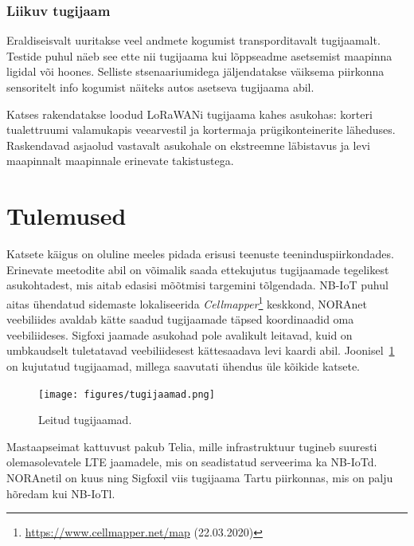 \documentclass[12pt]{article}
\begin{document}
    \subsubsection{Liikuv tugijaam}

    Eraldiseisvalt uuritakse veel andmete kogumist transporditavalt tugijaamalt.
    Testide puhul näeb see ette nii tugijaama kui lõppseadme asetsemist maapinna ligidal või hoones.
    Selliste stsenaariumidega jäljendatakse väiksema piirkonna sensoritelt info kogumist näiteks autos asetseva tugijaama abil.

    Katses rakendatakse loodud LoRaWANi tugijaama kahes asukohas: korteri tualettruumi valamukapis veearvestil ja kortermaja prügikonteinerite läheduses.
    Raskendavad asjaolud vastavalt asukohale on ekstreemne läbistavus ja levi maapinnalt maapinnale erinevate takistustega.

    \newpage


    \section{Tulemused}

    Katsete käigus on oluline meeles pidada erisusi teenuste teeninduspiirkondades.
    Erinevate meetodite abil on võimalik saada ettekujutus tugijaamade tegelikest asukohtadest, mis aitab edasisi mõõtmisi targemini tõlgendada.
    NB-IoT puhul aitas ühendatud sidemaste lokaliseerida \textit{Cellmapper}\footnote{\url{https://www.cellmapper.net/map} (22.03.2020)} keskkond, NORAnet veebiliides avaldab kätte saadud tugijaamade täpsed koordinaadid oma veebiliideses.
    Sigfoxi jaamade asukohad pole avalikult leitavad, kuid on umbkaudselt tuletatavad veebiliidesest kättesaadava levi kaardi abil.
    Joonisel~\ref{fig:tugijaamad} on kujutatud tugijaamad, millega saavutati ühendus üle kõikide katsete.

    \begin{figure} [ht]
        \begin{center}
            \texttt{[image: figures/tugijaamad.png]}
            \caption{Leitud tugijaamad.}
            \label{fig:tugijaamad}
        \end{center}
    \end{figure}

    Mastaapseimat kattuvust pakub Telia, mille infrastruktuur tugineb suuresti olemasolevatele LTE jaamadele, mis on seadistatud serveerima ka NB-IoTd.
    NORAnetil on kuus ning Sigfoxil viis tugijaama Tartu piirkonnas, mis on palju hõredam kui NB-IoTl.
\end{document}
